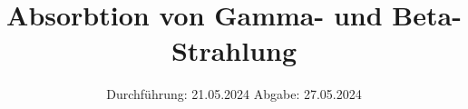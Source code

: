 

\subject{V704}
\title{Absorbtion von Gamma- und Beta-Strahlung}
\date{%
  Durchführung: 21.05.2024
  \hspace{3em}
  Abgabe: 27.05.2024}



\maketitle
\thispagestyle{empty}
\tableofcontents
\newpage






\printbibliography{}


